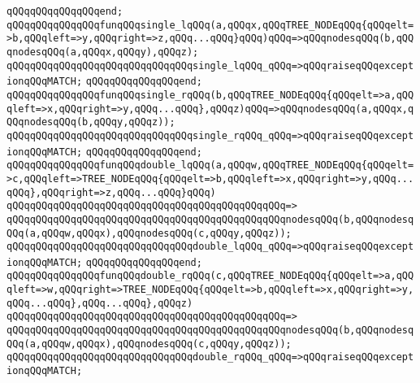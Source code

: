 \verb|qQQqqQQqqQQqqQQqend;|\newline
\newline
\verb|qQQqqQQqqQQqqQQqfunqQQqsingle_lqQQq(a,qQQqx,qQQqTREE_NODEqQQq{qQQqelt=>b,qQQqleft=>y,qQQqright=>z,qQQq...qQQq}qQQq)qQQq=>qQQqnodesqQQq(b,qQQqnodesqQQq(a,qQQqx,qQQqy),qQQqz);|\newline
\verb|qQQqqQQqqQQqqQQqqQQqqQQqqQQqqQQqsingle_lqQQq_qQQq=>qQQqraiseqQQqexceptionqQQqMATCH;|\newline
\verb|qQQqqQQqqQQqqQQqend;|\newline
\newline
\verb|qQQqqQQqqQQqqQQqfunqQQqsingle_rqQQq(b,qQQqTREE_NODEqQQq{qQQqelt=>a,qQQqleft=>x,qQQqright=>y,qQQq...qQQq},qQQqz)qQQq=>qQQqnodesqQQq(a,qQQqx,qQQqnodesqQQq(b,qQQqy,qQQqz));|\newline
\verb|qQQqqQQqqQQqqQQqqQQqqQQqqQQqqQQqsingle_rqQQq_qQQq=>qQQqraiseqQQqexceptionqQQqMATCH;|\newline
\verb|qQQqqQQqqQQqqQQqend;|\newline
\newline
\verb|qQQqqQQqqQQqqQQqfunqQQqdouble_lqQQq(a,qQQqw,qQQqTREE_NODEqQQq{qQQqelt=>c,qQQqleft=>TREE_NODEqQQq{qQQqelt=>b,qQQqleft=>x,qQQqright=>y,qQQq...qQQq},qQQqright=>z,qQQq...qQQq}qQQq)|\newline
\verb|qQQqqQQqqQQqqQQqqQQqqQQqqQQqqQQqqQQqqQQqqQQqqQQq=>|\newline
\verb|qQQqqQQqqQQqqQQqqQQqqQQqqQQqqQQqqQQqqQQqqQQqqQQqnodesqQQq(b,qQQqnodesqQQq(a,qQQqw,qQQqx),qQQqnodesqQQq(c,qQQqy,qQQqz));|\newline
\newline
\verb|qQQqqQQqqQQqqQQqqQQqqQQqqQQqqQQqdouble_lqQQq_qQQq=>qQQqraiseqQQqexceptionqQQqMATCH;|\newline
\verb|qQQqqQQqqQQqqQQqend;|\newline
\newline
\verb|qQQqqQQqqQQqqQQqfunqQQqdouble_rqQQq(c,qQQqTREE_NODEqQQq{qQQqelt=>a,qQQqleft=>w,qQQqright=>TREE_NODEqQQq{qQQqelt=>b,qQQqleft=>x,qQQqright=>y,qQQq...qQQq},qQQq...qQQq},qQQqz)|\newline
\verb|qQQqqQQqqQQqqQQqqQQqqQQqqQQqqQQqqQQqqQQqqQQqqQQq=>|\newline
\verb|qQQqqQQqqQQqqQQqqQQqqQQqqQQqqQQqqQQqqQQqqQQqqQQqnodesqQQq(b,qQQqnodesqQQq(a,qQQqw,qQQqx),qQQqnodesqQQq(c,qQQqy,qQQqz));|\newline
\newline
\verb|qQQqqQQqqQQqqQQqqQQqqQQqqQQqqQQqdouble_rqQQq_qQQq=>qQQqraiseqQQqexceptionqQQqMATCH;|\newline
